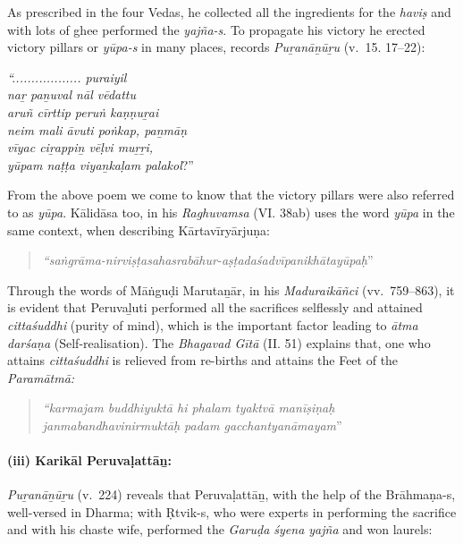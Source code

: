 \vskip -7pt

As prescribed in the four Vedas, he collected all the ingredients for the \textit{haviṣ} and with lots of ghee performed the \textit{yajña-s}. To propagate his victory he erected victory pillars or \textit{yūpa-s} in many places, records \textit{Puṟanāṉūṟu} (v.~15. 17–22):

\textit{“.................. puraiyil}\\\textit{naṟ paṉuval nāl vēdattu}\\\textit{aruñ cīrttip peruṅ kaṇṇuṟai}\\\textit{neim mali āvuti poṅkap, paṉmāṇ}\\\textit{vīyac ciṟappiṉ vēḷvi muṟṟi,}\\\textit{yūpam naṭṭa viyaṉkaḷam palakol}?”

From the above poem we come to know that the victory pillars were also referred to as \textit{yūpa}. Kālidāsa too, in his \textit{Raghuvamsa} (VI. 38ab) uses the word \textit{yūpa} in the same context, when describing Kārtavīryārjuṇa:

\begin{quote}
\textit{“saṅgrāma-nirviṣṭasahasrabāhur-aṣṭadaśadvīpanikhātayūpaḥ}” 
\end{quote}

Through the words of Māṅguḍi Marutaṉār, in his \textit{Maduraikāñci} (vv.~759–863), it is evident that Peruvaḻuti performed all the sacrifices selflessly and attained \textit{cittaśuddhi} (purity of mind), which is the important factor leading to \textit{ātma darśaṇa} (Self-realisation). The \textit{Bhagavad Gītā} (II. 51) explains that, one who attains \textit{cittaśuddhi} is relieved from re-births and attains the Feet of the \textit{Paramātmā:}

\begin{quote}
\textit{“karmajam buddhiyuktā hi phalam tyaktvā manīṣiṇaḥ}\\\textit{janmabandhavinirmuktāḥ padam gacchantyanāmayam}”
\end{quote}


\paragraph*{(iii) Karikāl Peruvaḷattāṉ:}

\vskip -7pt

\textit{Puṟanāṉūṟu} (v.~224) reveals that Peruvaḷattāṉ, with the help of the Brāhmaṇa-s, well-versed in Dharma; with Ṛtvik-s, who were experts in performing the sacrifice and with his chaste wife, performed the \textit{Garuḍa śyena yajña} and won laurels:

